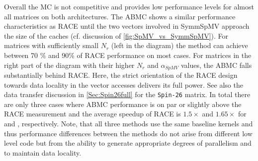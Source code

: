 Overall the \acrshort{MC} is not competitive and provides low performance levels for almost all matrices on both architectures. The \acrshort{ABMC} shows a similar performance characteristics as \acrshort{RACE} until the two vectors involved in \acrshort{SymmSpMV} approach the size of the caches (cf. discussion of \cref{fig:SpMV_vs_SymmSpMV}). For matrices with sufficiently small $N_r$ (left in the diagram) the method can achieve between 70 \% and 90\% of \acrshort{RACE} performance on most cases. For matrices in the right part of the diagram with their higher $N_r$ and $\alpha_{SpMV}$ values, the \acrshort{ABMC} falls substantially behind \acrshort{RACE}. Here, the strict orientation of the \acrshort{RACE} design towards data locality in the vector accesses delivers its full power. See also the data transfer discussion in \cref{Sec:Spin26full} for the \texttt{Spin-26} matrix.
In total there are only three cases where \acrshort{ABMC} performance is on par or slightly above the \acrshort{RACE} measurement and the average speedup of \acrshort{RACE} is $1.5\times$ and $1.65 \times$ for \IVB and \SKX, respectively.
Note, that all three methods use the same baseline kernels and thus performance differences between the methods do not arise from different low level code but from the ability to generate appropriate degrees of parallelism and to maintain data locality.

